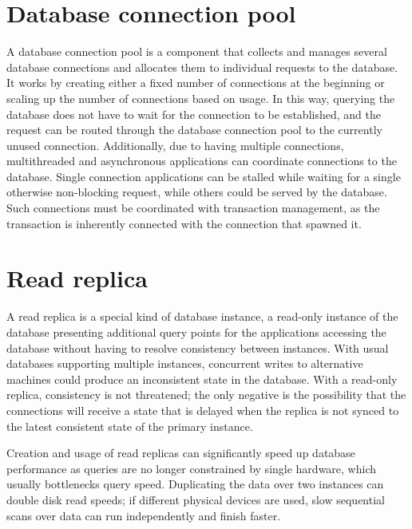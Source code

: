 \section{Database connection pool}
A database connection pool is a component that collects and manages several database connections and allocates them to individual requests to the database. It works by creating either a fixed number of connections at the beginning or scaling up the number of connections based on usage. In this way, querying the database does not have to wait for the connection to be established, and the request can be routed through the database connection pool to the currently unused connection. Additionally, due to having multiple connections, multithreaded and asynchronous applications can coordinate connections to the database. Single connection applications can be stalled while waiting for a single otherwise non-blocking request, while others could be served by the database. Such connections must be coordinated with transaction management, as the transaction is inherently connected with the connection that spawned it. \par

\section{Read replica}
A read replica is a special kind of database instance, a read-only instance of the database presenting additional query points for the applications accessing the database without having to resolve consistency between instances. With usual databases supporting multiple instances, concurrent writes to alternative machines could produce an inconsistent state in the database. With a read-only replica, consistency is not threatened; the only negative is the possibility that the connections will receive a state that is delayed when the replica is not synced to the latest consistent state of the primary instance.\par
Creation and usage of read replicas can significantly speed up database performance as queries are no longer constrained by single hardware, which usually bottlenecks query speed. Duplicating the data over two instances can double disk read speeds; if different physical devices are used, slow sequential scans over data can run independently and finish faster.\par

